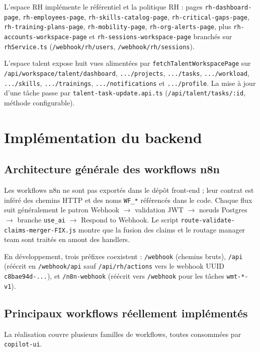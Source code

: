 L'espace RH implémente le référentiel et la politique RH : pages \texttt{rh-dashboard-page}, \texttt{rh-employees-page}, \texttt{rh-skills-catalog-page}, \texttt{rh-critical-gaps-page}, \texttt{rh-training-plans-page}, \texttt{rh-mobility-page}, \texttt{rh-org-alerts-page}, plus \texttt{rh-accounts-workspace-page} et \texttt{rh-sessions-workspace-page} branchés sur \texttt{rhService.ts} (\texttt{/webhook/rh/users}, \texttt{/webhook/rh/sessions}).

L'espace talent expose huit vues alimentées par \texttt{fetchTalentWorkspacePage} sur \texttt{/api/workspace/talent/dashboard}, \texttt{.../projects}, \texttt{.../tasks}, \texttt{.../workload}, \texttt{.../skills}, \texttt{.../trainings}, \texttt{.../notifications} et \texttt{.../profile}. La mise à jour d'une tâche passe par \texttt{talent-task-update.api.ts} (\texttt{/api/talent/tasks/:id}, méthode configurable).

\section{Implémentation du backend}

\subsection{Architecture générale des workflows n8n}

Les workflows n8n ne sont pas exportés dans le dépôt front-end ; leur contrat est inféré des chemins HTTP et des noms \texttt{WF\_*} référencés dans le code. Chaque flux suit généralement le patron Webhook $\rightarrow$ validation JWT $\rightarrow$ nœuds Postgres $\rightarrow$ branche \texttt{use\_ai} $\rightarrow$ Respond to Webhook. Le script \texttt{route-validate-claims-merger-FIX.js} montre que la fusion des claims et le routage manager team sont traités en amont des handlers.

En développement, trois préfixes coexistent : \texttt{/webhook} (chemins bruts), \texttt{/api} (réécrit en \texttt{/webhook/api} sauf \texttt{/api/rh/actions} vers le webhook UUID \texttt{c8bae94d-...}), et \texttt{/n8n-webhook} (réécrit vers \texttt{/webhook} pour les tâches \texttt{wmt-*-v1}).

\subsection{Principaux workflows réellement implémentés}

La réalisation couvre plusieurs familles de workflows, toutes consommées par \texttt{copilot-ui}.

